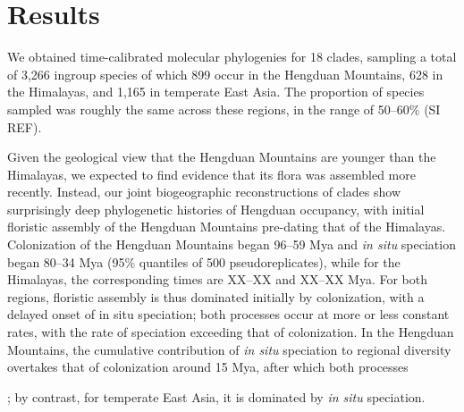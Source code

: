 \section{Results}

We obtained time-calibrated molecular phylogenies for 18 clades, sampling a total of 3,266 ingroup species of which 899 occur in the Hengduan Mountains, 628 in the Himalayas, and 1,165 in temperate East Asia. The proportion of species sampled was roughly the same across these regions, in the range of 50--60\% (SI REF).

Given the geological view that the Hengduan Mountains are younger than the Himalayas, we expected to find evidence that its flora was assembled more recently. Instead, our joint biogeographic reconstructions of clades show surprisingly deep phylogenetic histories of Hengduan occupancy, with initial floristic assembly of the Hengduan Mountains pre-dating that of the Himalayas. Colonization of the Hengduan Mountains began 96--59 Mya and \textit{in situ} speciation began 80--34 Mya (95\% quantiles of 500 pseudoreplicates), while for the Himalayas, the corresponding times are XX--XX and XX--XX Mya. For both regions, floristic assembly is thus dominated initially by colonization, with a delayed onset of in situ speciation; both processes occur at more or less constant rates, with the rate of speciation exceeding that of colonization. In the Hengduan Mountains, the cumulative contribution of \textit{in situ} speciation to regional diversity overtakes that of colonization around 15 Mya, after which both processes 

; by contrast, for temperate East Asia, it is dominated by \textit{in situ} speciation. 